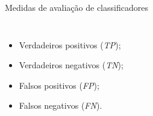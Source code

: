 \documentclass[%
  10pt,%
  aspectratio = 169,%
  compress,%
  t,%
]{beamer}%
\begin{document}
    \begin{frame}[fragile = singleslide]{}{Medidas de avaliação de classificadores}
        \begin{columns}[t]
            \vspace{0.3cm}
            \begin{itemize}
                \item Verdadeiros positivos (\textit{TP});

                \item Verdadeiros negativos (\textit{TN});

                \item Falsos positivos (\textit{FP});

                \item Falsos negativos (\textit{FN}).
            \end{itemize}

            
        \end{columns}
    \end{frame}
\end{document}
